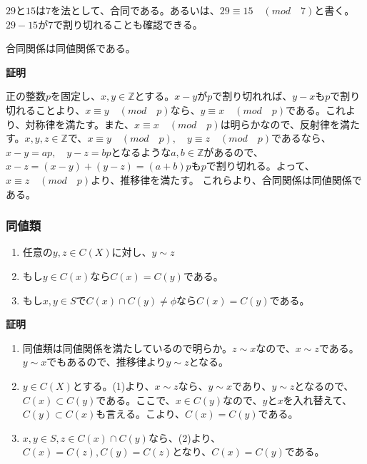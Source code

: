 \documentclass[dvipdfmx,autodetect-engine]{jsarticle}
\begin{document}
\exam $29$と$15$は$7$を法として、合同である。あるいは、$29 \equiv 15 \quad (mod \quad 7)$と書く。$29 - 15$が$7$で割り切れることも確認できる。

\prop 合同関係は同値関係である。

{\bf 証明}

正の整数$p$を固定し、$x, y \in \mathbb{Z}$とする。$x - y$が$p$で割り切れれば、$y - x$も$p$で割り切れることより、$x \equiv y \quad (mod \quad p)$なら、$y \equiv x \quad (mod \quad p)$である。これより、対称律を満たす。また、$x \equiv x \quad (mod \quad p)$は明らかなので、反射律を満たす。$x, y, z \in \mathbb{Z}$で、$x \equiv y \quad (mod \quad p), \quad y \equiv z \quad (mod \quad p)$であるなら、$x-y = ap,\quad y-z=bp$となるような$a, b \in \mathbb{Z}$があるので、$x - z = (x - y) + (y - z) = (a + b)p$も$p$で割り切れる。よって、$x \equiv z \quad (mod \quad p)$より、推移律を満たす。
これらより、合同関係は同値関係である。

\subsubsection{同値類}

\label{defi:equivClass}

\label{prop:equivClass}

\begin{enumerate}
\renewcommand{\labelenumi}{(\arabic{enumi})}
\item 任意の$y,z \in C(X)$に対し、$y \sim z$
\item もし$y \in C(x)$なら$C(x) = C(y)$である。
\item もし$x,y \in S$で$C(x) \cap C(y) \neq \phi$なら$C(x) = C(y)$である。
\end{enumerate}

{\bf 証明}

\begin{enumerate}
\renewcommand{\labelenumi}{(\arabic{enumi})}
\item 同値類は同値関係を満たしているので明らか。$z \sim x$なので、$x \sim z$である。$y \sim x$でもあるので、推移律より$y \sim z$となる。
\item $y \in C(X)$とする。(1)より、$x \sim z$なら、$y \sim x$であり、$y \sim z$となるので、$C(x) \subset C(y)$である。ここで、$x \in C(y)$なので、$y$と$x$を入れ替えて、
$C(y) \subset C(x)$も言える。こより、$C(x) = C(y)$である。
\item $x,y \in S, z \in C(x) \cap C(y)$なら、(2)より、$C(x) = C(z), C(y) = C(z)$となり、$C(x) = C(y)$である。
\end{enumerate}
\end{document}
